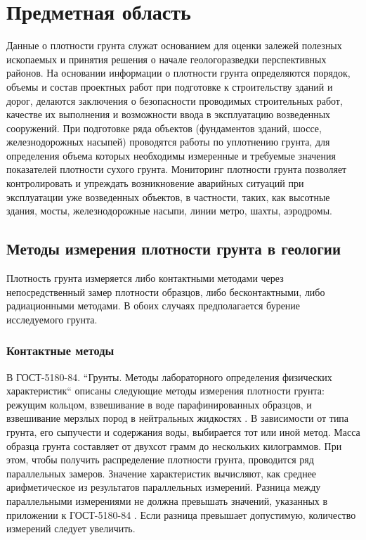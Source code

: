 \chapter{Предметная область} \label{chapt1}
Данные о плотности грунта служат основанием для оценки залежей полезных ископаемых 
и принятия решения о начале геологоразведки перспективных районов. На основании  информации о плотности грунта 
определяются порядок, объемы и состав проектных работ при подготовке к строительству зданий и дорог, делаются заключения о безопасности проводимых 
строительных работ, качестве их выполнения и возможности ввода в эксплуатацию возведенных сооружений. При подготовке ряда объектов 
(фундаментов зданий, шоссе, железнодорожных насыпей) проводятся работы по уплотнению грунта,
 для определения объема которых необходимы измеренные и требуемые значения показателей плотности сухого грунта.
Мониторинг плотности грунта позволяет контролировать и упреждать возникновение аварийных ситуаций при эксплуатации уже возведенных объектов, 
в частности, таких, как высотные здания, мосты, железнодорожные насыпи, линии метро, шахты, аэродромы.


\section{Методы измерения плотности грунта в геологии} \label{sect1_1}

Плотность грунта измеряется либо контактными методами через непосредственный замер плотности образцов, 
либо бесконтактными, либо радиационными методами. 
В обоих случаях предполагается бурение исследуемого грунта. 

\subsection{Контактные методы}\label{subsect1_1_1}

В ГОСТ-5180-84. ``Грунты. Методы лабораторного определения физических характеристик`` описаны следующие 
методы измерения плотности грунта: режущим кольцом, взвешивание в воде парафинированных образцов, и 
взвешивание мерзлых пород в нейтральных жидкостях . В зависимости от типа грунта, его сыпучести и содержания воды,
выбирается тот или иной метод. Масса образца грунта составляет от двухсот грамм до нескольких килограммов. При этом, чтобы получить 
распределение плотности грунта, проводится ряд параллельных замеров. Значение характеристик вычисляют, как 
среднее арифметическое из результатов параллельных измерений. 
Разница между параллельными измерениями не должна превышать значений, указанных в приложении к ГОСТ-5180-84 \cite{gost5180}. 
Если разница превышает допустимую, количество измерений следует увеличить.

